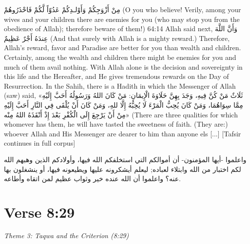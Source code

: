 \documentclass[11pt,a4paper,openany]{book}
\let\textAR\textarabic
\begin{document}
\begin{tafsirbox}
\textAR{مِنْ} \textAR{أَزْوَجِكُمْ} \textAR{وَأَوْلـدِكُمْ} \textAR{عَدُوّاً} \textAR{لَّكُمْ} \textAR{فَاحْذَرُوهُمْ} (O you who believe! Verily, among your wives and your children there are enemies for you (who may stop you from the obedience of Allah); therefore beware of them!) 64:14 Allah said next, \textAR{وَأَنَّ} \textAR{اللَّهَ} \textAR{عِندَهُ} \textAR{أَجْرٌ} \textAR{عَظِيمٌ} (And that surely with Allah is a mighty reward.) Therefore, Allah's reward, favor and Paradise are better for you than wealth and children. Certainly, among the wealth and children there might be enemies for you and much of them avail nothing. With Allah alone is the decision and sovereignty in this life and the Hereafter, and He gives tremendous rewards on the Day of Resurrection. In the Sahih, there is a Hadith in which the Messenger of Allah (saw) said, \textAR{«ثَلَاثٌ} \textAR{مَنْ} \textAR{كُنَّ} \textAR{فِيهِ،} \textAR{وَجَدَ} \textAR{بِهِنَّ} \textAR{حَلَاوَةَ} \textAR{الْإِيمَانِ}: \textAR{مَنْ} \textAR{كَانَ} \textAR{اللهُ} \textAR{وَرَسُولُهُ} \textAR{أَحَبَّ} \textAR{إِلَيْهِ} \textAR{مِمَّا} \textAR{سِوَاهُمَا،} \textAR{وَمَنْ} \textAR{كَانَ} \textAR{يُحِبُّ} \textAR{الْمَرْءَ} \textAR{لَا} \textAR{يُحِبُّهُ} \textAR{إِلَّا} \textAR{للهِ،} \textAR{وَمَنْ} \textAR{كَانَ} \textAR{أَنْ} \textAR{يُلْقَى} \textAR{فِي} \textAR{النَّارِ} \textAR{أَحَبَّ} \textAR{إِلَيْهِ} \textAR{مِنْ} \textAR{أَنْ} \textAR{يَرْجِعَ} \textAR{إِلَى} \textAR{الْكُفْرِ} \textAR{بَعْدَ} \textAR{إِذْ} \textAR{أَنْقَذَهُ} \textAR{اللهُ} \textAR{مِنْه»} (There are three qualities for which whomever has them, he will have tasted the sweetness of faith. (They are:) whoever Allah and His Messenger are dearer to him than anyone els [...] [Tafsir continues in full corpus]
\end{tafsirbox}


\begin{muyassarbox}
\textAR{واعلموا -أيها المؤمنون- أن أموالكم التي استخلفكم الله فيها، وأولادكم الذين وهبهم الله لكم اختبار من الله وابتلاء لعباده; ليعلم أيشكرونه عليها ويطيعونه فيها، أو ينشغلون بها عنه؟ واعلموا أن الله عنده خير وثواب عظيم لمن اتقاه وأطاعه.}
\end{muyassarbox}


\newpage

\section{Verse 8:29}
{\small\color{accent2}\itshape Theme 3: Taqwa and the Criterion (8:29)}
\end{document}
